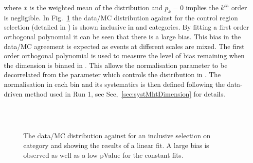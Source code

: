 where $\bar{x}$ is the weighted mean of the distribution and $p_k = 0$ 
implies the $k^{th}$ order is negligible.
In Fig.~\ref{fig:linearMotiv} the data/MC 
distribution against \mht for the control region selection 
(detailed in \cite{Khachatryan:2016pxa}) is shown inclusive 
in \scalht and categories. By fitting a first order
orthogonal polynomial it can be seen that there is a large bias. 
This bias in the data/MC agreement is expected as events 
at different scales are mixed.
The first order orthogonal polynomial
is used to measure the level of bias remaining 
when the \mht dimension is binned in \scalht.
This allows the normalisation parameter to be
decorrelated from the parameter which controls
the distribution in \mht.
The normalisation in each \scalht bin and its systematics 
is then defined following the data-driven method used in Run 1, see Sec,~\ref{sec:systMhtDimension} for details.
\begin{figure}[h!]
  \centering
  ~~
  \\
  \\
  \caption{\label{fig:linearMotiv} 
  The data/MC distribution against \mht for an inclusive selection on category and \scalht
  showing the results of a linear fit. A large bias is observed as well as a low pValue for the constant fits. 
 }
\end{figure}

